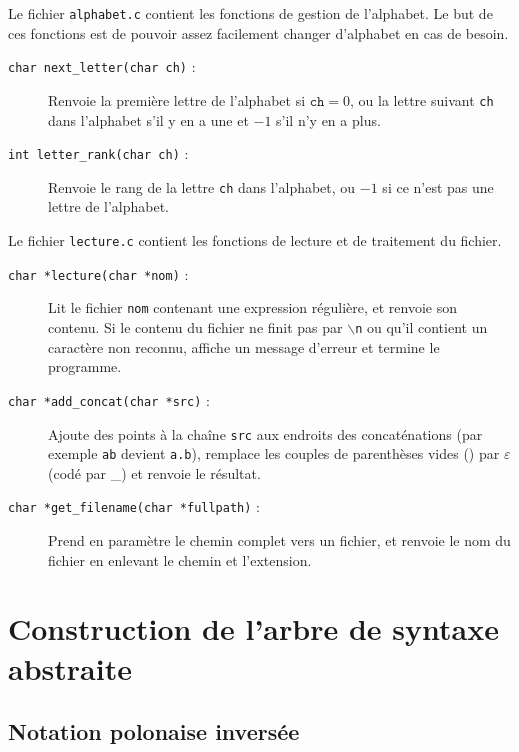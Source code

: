 \documentclass[12pt, a4paper]{article}
\begin{document}
Le fichier \texttt{alphabet.c} contient les fonctions de gestion de l'alphabet. Le but de ces fonctions est de pouvoir assez facilement changer d'alphabet en cas de besoin.
\begin{description}
\item[\texttt{char next\_letter(char ch)} :] Renvoie la première lettre de l'alphabet si $\texttt{ch} = 0$, ou la lettre suivant \texttt{ch} dans l'alphabet s'il y en a une et $-1$ s'il n'y en a plus.
\item[\texttt{int letter\_rank(char ch)} :] Renvoie le rang de la lettre \texttt{ch} dans l'alphabet, ou $-1$ si ce n'est pas une lettre de l'alphabet.
\end{description}

Le fichier \texttt{lecture.c} contient les fonctions de lecture et de traitement du fichier.
\begin{description}
\item[\texttt{char *lecture(char *nom)} :] Lit le fichier \texttt{nom} contenant une expression régulière, et renvoie son contenu. Si le contenu du fichier ne finit pas par \texttt{$\backslash$n} ou qu'il contient un caractère non reconnu, affiche un message d'erreur et termine le programme.
\item[\texttt{char *add\_concat(char *src)} :] Ajoute des points à la chaîne \texttt{src} aux endroits des concaténations (par exemple \texttt{ab} devient \texttt{a.b}), remplace les couples de parenthèses vides () par $\varepsilon$ (codé par \_) et renvoie le résultat.
\item[\texttt{char *get\_filename(char *fullpath)} :] Prend en paramètre le chemin complet vers un fichier, et renvoie le nom du fichier en enlevant le chemin et l'extension.
\end{description}

\section{Construction de l'arbre de syntaxe abstraite}

\subsection{Notation polonaise inversée}
\end{document}
